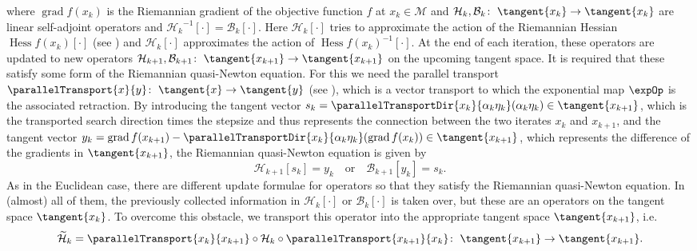 where $\operatorname{grad} f(x_k)$ is the Riemannian gradient of the objective function $f$ at $x_k \in \mathcal{M}$ and $\mathcal{H}_k, \mathcal{B}_k \colon \; \tangent{x_k} \to \tangent{x_k}$ are linear self-adjoint operators and ${\mathcal{H}_k}^{-1} [\cdot] = \mathcal{B}_k [\cdot]$. Here $\mathcal{H}_k [\cdot]$ tries to approximate the action of the Riemannian Hessian $\operatorname{Hess} f(x_k) [\cdot]$ (see \cite[Definition~5.5.1]{AbsilMahonySepulchre:2008}) and $\mathcal{H}_k [\cdot]$ approximates the action of ${\operatorname{Hess} f(x_k)}^{-1} [\cdot]$. At the end of each iteration, these operators are updated to new operators $\mathcal{H}_{k+1}, \mathcal{B}_{k+1} \colon \; \tangent{x_{k+1}} \to \tangent{x_{k+1}}$ on the upcoming tangent space. It is required that these satisfy some form of the Riemannian quasi-Newton equation. For this we need the parallel transport $\parallelTransport{x}{y} \colon \; \tangent{x} \to \tangent{y}$ (see \cite[p.~169-170]{AbsilMahonySepulchre:2008}), which is a vector transport to which the exponential map $\expOp$ is the associated retraction. By introducing the tangent vector $s_k = \parallelTransportDir{x_k}{\alpha_k \eta_k}(\alpha_k \eta_k) \in \tangent{x_{k+1}}$, which is the transported search direction times the stepsize and thus represents the connection between the two iterates $x_k$ and $x_{k+1}$, and the tangent vector $y_k = \operatorname{grad} f(x_{k+1}) - \parallelTransportDir{x_k}{\alpha_k \eta_k}(\operatorname{grad} f(x_k)) \in \tangent{x_{k+1}}$, which represents the difference of the gradients in $\tangent{x_{k+1}}$, the Riemannian quasi-Newton equation is given by 
\begin{equation*}
    \mathcal{H}_{k+1} [s_k] = y_k \quad \text{or} \quad \mathcal{B}_{k+1} [y_k] = s_k.
\end{equation*}
As in the Euclidean case, there are different update formulae for operators so that they satisfy the Riemannian quasi-Newton equation. In (almost) all of them, the previously collected information in $\mathcal{H}_k [\cdot]$ or $\mathcal{B}_k [\cdot]$ is taken over, but these are an operators on the tangent space $\tangent{x_k}$. To overcome this obstacle, we transport this operator into the appropriate tangent space $\tangent{x_{k+1}}$, i.e.
\begin{equation*}
    \widetilde{\mathcal{H}}_k = \parallelTransport{x_k}{x_{k+1}} \circ \mathcal{H}_k \circ \parallelTransport{x_{k+1}}{x_k} \colon \; \tangent{x_{k+1}} \to \tangent{x_{k+1}}.
\end{equation*}
